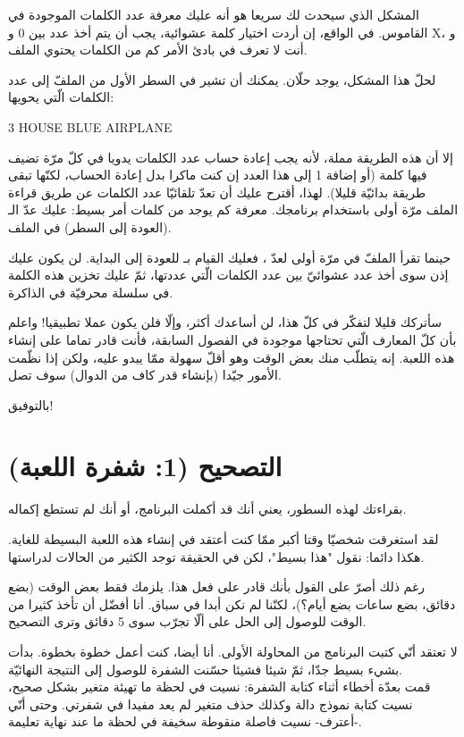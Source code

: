 المشكل الذي سيحدث لك سريعا هو أنه عليك معرفة عدد الكلمات الموجودة في القاموس. في الواقع، إن أردت اختيار كلمة عشوائية، يجب أن يتم أخذ عدد بين 0 و
\textenglish{X}،
و أنت لا تعرف في بادئ الأمر كم من الكلمات يحتوي الملف.

لحلّ هذا المشكل، يوجد حلّان. يمكنك أن تشير في السطر الأول من الملفّ إلى عدد الكلمات الّتي يحويها:

\begin{Console}
3
HOUSE
BLUE
AIRPLANE
\end{Console}

إلا أن هذه الطريقة مملة، لأنه يجب إعادة حساب عدد الكلمات يدويا في كلّ مرّة تضيف فيها كلمة (أو إضافة 1 إلى هذا العدد إن كنت ماكرا بدل إعادة الحساب، لكنّها تبقى طريقة بدائيّة قليلا). لهذا، أقترح عليك أن تعدّ تلقائيّا عدد الكلمات عن طريق قراءة الملف مرّة أولى باستخدام برنامجك. معرفة كم يوجد من كلمات أمر بسيط: عليك عدّ الـ
(العودة إلى السطر) في الملف.

حينما تقرأ الملفّ في مرّة أولى لعدّ
،
فعليك القيام بـ
للعودة إلى البداية. لن يكون عليك إذن سوى أخذ عدد عشوائيّ بين عدد الكلمات الّتي عددتها، ثمّ عليك تخزين هذه الكلمة في سلسلة محرفيّة في الذاكرة.

سأتركك قليلا لتفكّر في كلّ هذا، لن أساعدك أكثر، وإلّا فلن يكون عملا تطبيقيا! واعلم بأن  كلّ المعارف الّتي تحتاجها موجودة في الفصول السابقة، فأنت قادر تماما على إنشاء هذه اللعبة. إنه يتطلّب منك بعض الوقت وهو أقلّ سهولة ممّا يبدو عليه، ولكن إذا نظّمت الأمور جيّدا (بإنشاء قدر كاف من الدوال) سوف تصل.

بالتوفيق!

\section{التصحيح (1: شفرة اللعبة)}

بقراءتك لهذه السطور، يعني أنك قد أكملت البرنامج، أو أنك لم تستطع إكماله.

لقد استغرقت شخصيّا وقتا أكبر ممّا كنت أعتقد في إنشاء هذه اللعبة البسيطة للغاية. هكذا دائما: نقول "هذا بسيط"، لكن في الحقيقة توجد الكثير من الحالات لدراستها.

رغم ذلك أصرّ على القول بأنك قادر على فعل هذا. يلزمك فقط بعض الوقت (بضع دقائق، بضع ساعات بضع أيام؟)، لكنّنا لم نكن أبدا في سباق. أنا أفضّل أن تأخذ كثيرا من الوقت للوصول إلى الحل على ألّا تجرّب سوى 5 دقائق وترى التصحيح.

لا تعتقد أنّي كتبت البرنامج من المحاولة الأولى. أنا أيضا، كنت أعمل خطوة بخطوة. بدأت بشيء بسيط جدّا، ثمّ شيئا فشيئا حسّنت الشفرة للوصول إلى النتيجة النهائيّة.\\
قمت بعدّة أخطاء أثناء كتابة الشفرة: نسيت في لحظة ما تهيئة متغير بشكل صحيح، نسيت كتابة نموذج دالة وكذلك حذف متغير لم يعد مفيدا في شفرتي. وحتى أنّي -أعترف- نسيت فاصلة منقوطة سخيفة في لحظة ما عند نهاية تعليمة.

